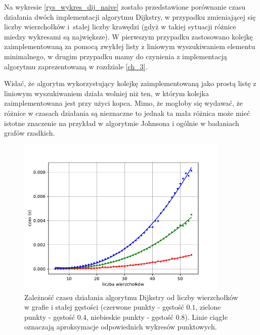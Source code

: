 \documentclass[12pt,a4paper]{book}
\theoremstyle{definition}
\numberwithin{equation}{chapter}
\begin{document}
Na wykresie \ref{rys_wykres_dij_naive} zostało przedstawione porównanie czasu działania dwóch implementacji algorytmu Dijkstry, w przypadku zmieniającej się liczby wierzchołków i~stałej liczby krawędzi (gdyż w takiej sytuacji różnice miedzy wykresami są największe). W pierwszym przypadku zastosowano kolejkę zaimplementowaną za pomocą zwykłej listy z liniowym wyszukiwaniem elementu minimalnego, w drugim przypadku mamy do czynienia z implementacją algorytmu zaprezentowaną w rozdziale \ref{ch_3}.   

Widać, że algorytm wykorzystujący kolejkę zaimplementowaną jako prostą listę z liniowym wyszukiwaniem działa wolniej niż ten, w którym kolejka zaimplementowana jest przy użyci kopca. Mimo, że mogłoby się wydawać, że różnice w czasach działania są nieznaczne to jednak ta mała różnica może mieć istotne znaczenie na przykład w algorytmie Johnsona i ogólnie w badaniach grafów rzadkich.

\begin{figure}[H]
\centering
\includegraphics[width=0.9\textwidth]{images/Wykres_Dijkstra_gestosci.pdf}
\caption{Zależność czasu działania algorytmu Dijkstry od liczby wierzchołków w grafie i stałej gęstości (czerwone punkty - gęstość $0.1$, zielone punkty - gęstość $0.4$, niebieskie punkty - gęstość $0.8$). Linie ciągłe oznaczają aproksymacje odpowiednich wykresów punktowych.}
\label{rys_wykres_dij_gestosci}
\end{figure}
\end{document}
